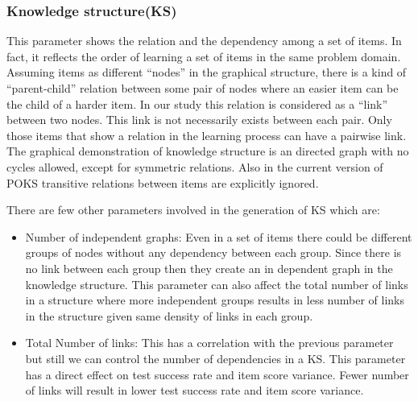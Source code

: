 \subsubsection{Knowledge structure(KS)}
This parameter shows the relation and the dependency among a set of items. In fact, it reflects the order of learning a set of items in the same problem domain. Assuming items as different ``nodes'' in the graphical structure, there is a kind of ``parent-child'' relation between some pair of nodes where an easier item can be the child of a harder item. In our study this relation is considered as a ``link'' between two nodes. This link is not necessarily exists between each pair. Only those items that show a relation in the learning process can have a pairwise link. 
The graphical demonstration of knowledge structure is an directed graph with no cycles allowed, except for symmetric relations. Also in the current version of POKS transitive relations between items are explicitly ignored. %



There are few other parameters involved in the generation of KS which are:
\begin{itemize}
\item Number of independent graphs: Even in a set of items there could be different groups of nodes without any dependency between each group. Since there is no link between each group then they create an in dependent graph in the knowledge structure. This parameter can also affect the total number of links in a structure where more independent groups results in less number of links in the structure given same density of links in each group. 
\item Total Number of links: This has a correlation with the previous parameter but still we can control the number of dependencies in a KS. This parameter has a direct effect on test success rate and item score variance. Fewer number of links will result in lower test success rate and item score variance.%
\end{itemize}



